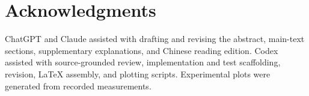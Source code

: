 \section*{Acknowledgments}
ChatGPT and Claude assisted with drafting and revising the abstract,
main-text sections, supplementary explanations, and Chinese reading edition. Codex assisted with
source-grounded review, implementation and test scaffolding, revision, LaTeX assembly, and plotting scripts.
Experimental plots were generated from recorded measurements.
